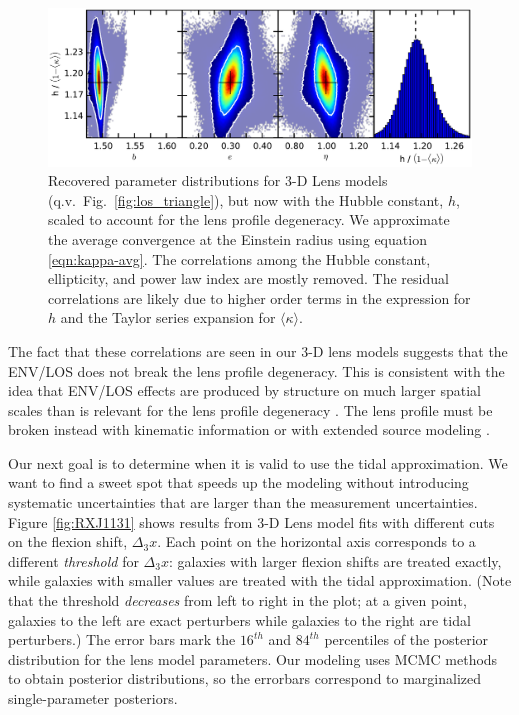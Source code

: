 \documentclass{emulateapj}
\begin{document}
\begin{figure}[ht]
\begin{center}
\includegraphics[width=1\textwidth]{los_scaled_h.pdf}
\caption{\label{fig:scaled_triangle} Recovered parameter distributions for 3-D Lens models (q.v.\ Fig.\ \ref{fig:los_triangle}), but now with the Hubble constant, $h$, scaled to account for the lens profile degeneracy.  We approximate the average convergence at the Einstein radius using equation \ref{eqn:kappa-avg}. The correlations among the Hubble constant, ellipticity, and power law index are mostly removed. The residual correlations are likely due to higher order terms in the expression for $h$ \citep{Kochanek02} and the Taylor series expansion for $\langle \kappa \rangle$.%
}
\end{center}
\end{figure}

The fact that these correlations are seen in our 3-D lens models suggests that the ENV/LOS does not break the lens profile degeneracy. This is consistent with the idea that ENV/LOS effects are produced by structure on much larger spatial scales than is relevant for the lens profile degeneracy \citep{Xu15,Schneider13}. The lens profile must be broken instead with kinematic information \citep[e.g.][]{Suyu13} or with extended source modeling \citep{Suyu12}.

Our next goal is to determine when it is valid to use the tidal approximation.  We want to find a sweet spot that speeds up the modeling without introducing systematic uncertainties that are larger than the measurement uncertainties.  Figure \ref{fig:RXJ1131} shows results from 3-D Lens model fits with different cuts on the flexion shift, $\Delta_3 x$.  Each point on the horizontal axis corresponds to a different \emph{threshold} for $\Delta_3 x$: galaxies with larger flexion shifts are treated exactly, while galaxies with smaller values are treated with the tidal approximation.  (Note that the threshold \emph{decreases} from left to right in the plot; at a given point, galaxies to the left are exact perturbers while galaxies to the right are tidal perturbers.)  The error bars mark the $16^{th}$ and $84^{th}$ percentiles of the posterior distribution for the lens model parameters.  Our modeling uses MCMC methods to obtain posterior distributions, so the errorbars correspond to marginalized single-parameter posteriors.
\end{document}
